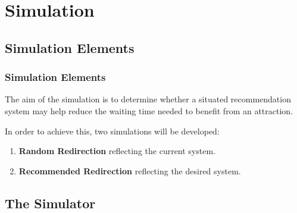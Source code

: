 \section{Simulation}\label{sec:simulation}
\frame{\tableofcontents[currentsection]}

\subsection{Simulation Elements}\label{subsec:simulation-elements}

\begin{frame}
    \frametitle{Simulation Elements}
    The aim of the simulation is to determine whether a situated recommendation system may help reduce the waiting time needed to benefit from an attraction.

    \bigskip

    In order to achieve this, two simulations will be developed:
    \begin{enumerate}
        \item \textbf{Random Redirection} reflecting the current system.
        \item \textbf{Recommended Redirection} reflecting the desired system.
    \end{enumerate}

\end{frame}

\subsection{The Simulator}\label{subsec:the-simulator}

